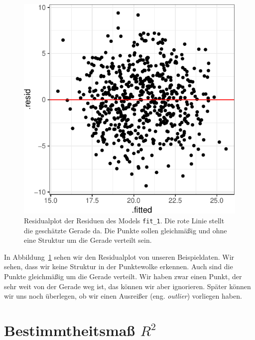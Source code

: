 \documentclass[
  letterpaper,
]{scrbook}
\begin{document}
\begin{figure}[H]

{\centering \includegraphics{./stat-linear-reg-quality_files/figure-pdf/fig-scatter-qual-01-1.pdf}

}

\caption{\label{fig-scatter-qual-01}Residualplot der Residuen des Models
\texttt{fit\_1}. Die rote Linie stellt die geschätzte Gerade da. Die
Punkte sollen gleichmäßig und ohne eine Struktur um die Gerade verteilt
sein.}

\end{figure}

{}

In Abbildung~\ref{fig-scatter-qual-01} sehen wir den Residualplot von
unseren Beispieldaten. Wir sehen, dass wir keine Struktur in der
Punktewolke erkennen. Auch sind die Punkte gleichmäßig um die Gerade
verteilt. Wir haben zwar einen Punkt, der sehr weit von der Gerade weg
ist, das können wir aber ignorieren. Später können wir uns noch
überlegen, ob wir einen Ausreißer (eng. \emph{outlier}) vorliegen haben.

\hypertarget{sec-linreg-bestimmt}{%
\section{\texorpdfstring{Bestimmtheitsmaß
\(R^2\)}{Bestimmtheitsmaß R\^{}2}}\label{sec-linreg-bestimmt}}
\end{document}
